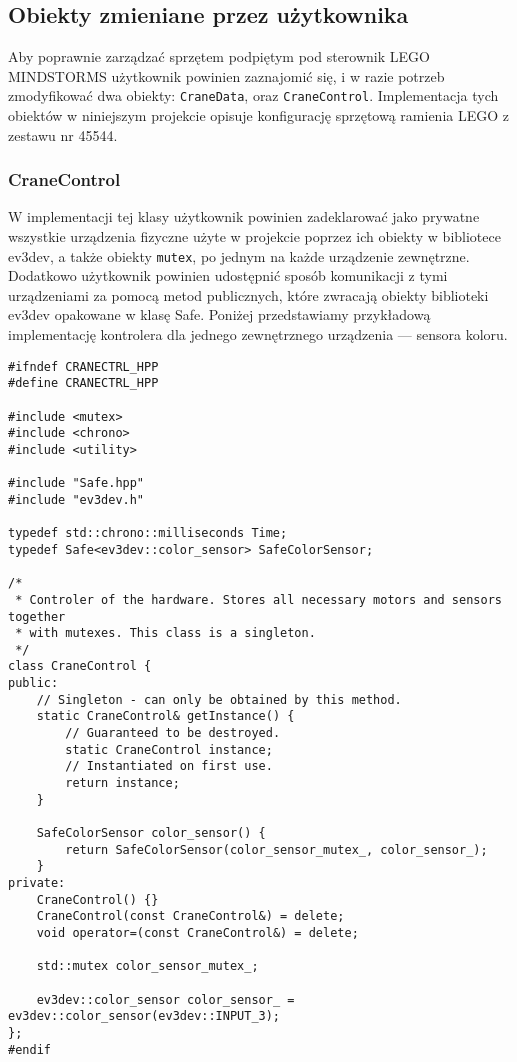 \documentclass{article}
\begin{document}
\subsection{Obiekty zmieniane przez użytkownika}\label{modifiable}
Aby poprawnie zarządzać sprzętem podpiętym pod sterownik LEGO MINDSTORMS
użytkownik powinien zaznajomić się, i w razie potrzeb zmodyfikować dwa obiekty:
\texttt{CraneData}, oraz \texttt{CraneControl}. Implementacja tych obiektów w
niniejszym projekcie opisuje konfigurację sprzętową ramienia LEGO z zestawu nr
45544.
\subsubsection*{CraneControl}
W implementacji tej klasy użytkownik powinien zadeklarować jako prywatne wszystkie urządzenia
fizyczne użyte w projekcie poprzez ich obiekty w bibliotece ev3dev, a także
obiekty \texttt{mutex}, po jednym na każde urządzenie zewnętrzne. Dodatkowo
użytkownik powinien udostępnić sposób komunikacji z tymi urządzeniami za
pomocą metod publicznych, które zwracają obiekty biblioteki ev3dev opakowane w
klasę Safe. Poniżej przedstawiamy przykładową implementację kontrolera dla
jednego zewnętrznego urządzenia --- sensora koloru.
\begin{lstlisting}
#ifndef CRANECTRL_HPP
#define CRANECTRL_HPP

#include <mutex>
#include <chrono>
#include <utility>

#include "Safe.hpp"
#include "ev3dev.h"

typedef std::chrono::milliseconds Time;
typedef Safe<ev3dev::color_sensor> SafeColorSensor;

/*
 * Controler of the hardware. Stores all necessary motors and sensors together
 * with mutexes. This class is a singleton.
 */
class CraneControl {
public:
    // Singleton - can only be obtained by this method.
    static CraneControl& getInstance() {
        // Guaranteed to be destroyed.
        static CraneControl instance;
        // Instantiated on first use.
        return instance;
    }

    SafeColorSensor color_sensor() {
        return SafeColorSensor(color_sensor_mutex_, color_sensor_);
    }
private:
    CraneControl() {}
    CraneControl(const CraneControl&) = delete;
    void operator=(const CraneControl&) = delete;

    std::mutex color_sensor_mutex_;

    ev3dev::color_sensor color_sensor_ = ev3dev::color_sensor(ev3dev::INPUT_3);
};
#endif
\end{lstlisting}
\end{document}
